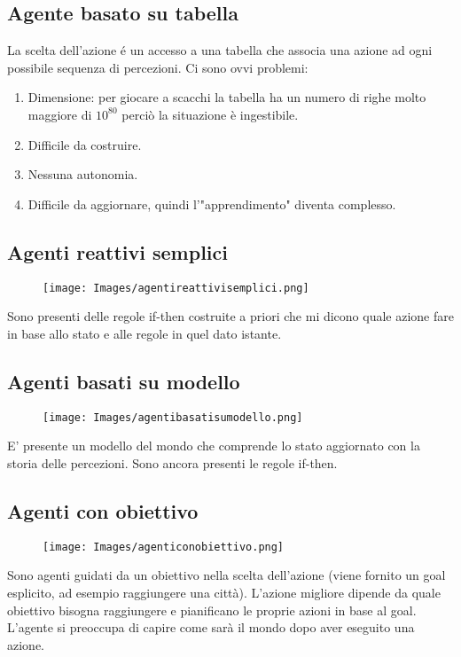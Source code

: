 \documentclass{article}
\begin{document}
\subsection{Agente basato su tabella}
La scelta dell'azione é un accesso a una tabella che associa una azione ad ogni possibile sequenza di percezioni. Ci sono ovvi problemi:
\begin{enumerate}
    \item Dimensione: per giocare a scacchi la tabella ha un numero di righe molto maggiore di $10^{80}$ perciò la situazione è ingestibile.
    \item Difficile da costruire.
    \item Nessuna autonomia.
    \item Difficile da aggiornare, quindi l'"apprendimento" diventa complesso.
\end{enumerate}

\subsection{Agenti reattivi semplici}
\begin{figure}[H]
    \centering
    \texttt{[image: Images/agentireattivisemplici.png]}
\end{figure}
Sono presenti delle regole if-then costruite a priori che mi dicono quale azione fare in base allo stato e alle regole in quel dato istante.
\clearpage

\subsection{Agenti basati su modello}
\begin{figure}[H]
    \centering
    \texttt{[image: Images/agentibasatisumodello.png]}
\end{figure}
E' presente un modello del mondo che comprende lo stato aggiornato con la storia delle percezioni. Sono ancora presenti le regole if-then.

\subsection{Agenti con obiettivo}
\begin{figure}[H]
    \centering
    \texttt{[image: Images/agenticonobiettivo.png]}
\end{figure}
Sono agenti guidati da un obiettivo nella scelta dell'azione (viene fornito un goal esplicito, ad esempio raggiungere una città). L'azione migliore dipende da quale obiettivo bisogna raggiungere e pianificano le proprie azioni in base al goal. L'agente si preoccupa di capire come sarà il mondo dopo aver eseguito una azione.
\end{document}
